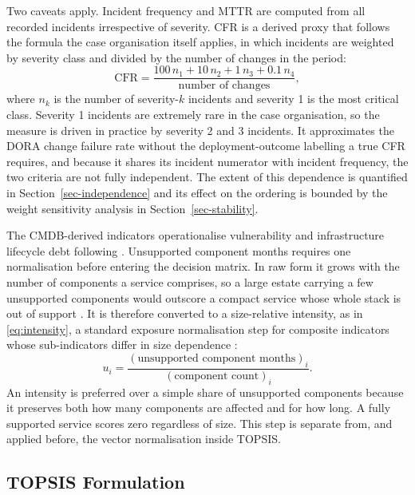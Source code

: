 \documentclass[
  authoryear,
  preprint]{elsarticle}
\begin{document}
Two caveats apply. Incident frequency and MTTR are computed from all
recorded incidents irrespective of severity. CFR is a derived proxy that
follows the formula the case organisation itself applies, in which
incidents are weighted by severity class and divided by the number of
changes in the period: \begin{equation}\label{eq:cfr}
\text{CFR} = \frac{100\,n_1 + 10\,n_2 + 1\,n_3 + 0.1\,n_4}{\text{number of changes}},
\end{equation} where \(n_k\) is the number of severity-\(k\) incidents
and severity 1 is the most critical class. Severity 1 incidents are
extremely rare in the case organisation, so the measure is driven in
practice by severity 2 and 3 incidents. It approximates the DORA change
failure rate without the deployment-outcome labelling a true CFR
requires, and because it shares its incident numerator with incident
frequency, the two criteria are not fully independent. The extent of
this dependence is quantified in Section~\ref{sec-independence} and its
effect on the ordering is bounded by the weight sensitivity analysis in
Section~\ref{sec-stability}.

The CMDB-derived indicators operationalise vulnerability and
infrastructure lifecycle debt following
\citet{hakiDigitalNudgingTechnical2023}. Unsupported component months
requires one normalisation before entering the decision matrix. In raw
form it grows with the number of components a service comprises, so a
large estate carrying a few unsupported components would outscore a
compact service whose whole stack is out of support
\citep{ampatzoglouReusabilityIndexMeasure2018}. It is therefore
converted to a size-relative intensity, as in \eqref{eq:intensity}, a
standard exposure normalisation step for composite indicators whose
sub-indicators differ in size dependence
\citep{nardoToolsCompositeIndicators2005, grecoMethodologicalFrameworkComposite2019}:
\begin{equation}\label{eq:intensity}
u_i = \frac{(\text{unsupported component months})_i}{(\text{component count})_i}.
\end{equation} An intensity is preferred over a simple share of
unsupported components because it preserves both how many components are
affected and for how long. A fully supported service scores zero
regardless of size. This step is separate from, and applied before, the
vector normalisation inside TOPSIS.

\subsection{TOPSIS Formulation}\label{sec-topsis}
\end{document}
